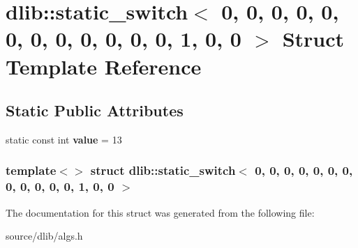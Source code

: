 \hypertarget{structdlib_1_1static__switch_3_010_00_010_00_010_00_010_00_010_00_010_00_010_00_010_00_010_00_01de46d05550779d2bbe7720ab7bfdb3cc}{
\section{dlib::static\_\-switch$<$ 0, 0, 0, 0, 0, 0, 0, 0, 0, 0, 0, 0, 1, 0, 0 $>$ Struct Template Reference}
\label{structdlib_1_1static__switch_3_010_00_010_00_010_00_010_00_010_00_010_00_010_00_010_00_010_00_01de46d05550779d2bbe7720ab7bfdb3cc}
}
\subsection*{Static Public Attributes}
\begin{DoxyCompactItemize}
\item 
\hypertarget{structdlib_1_1static__switch_3_010_00_010_00_010_00_010_00_010_00_010_00_010_00_010_00_010_00_01de46d05550779d2bbe7720ab7bfdb3cc_a0c184f8ebdf3aa4afb71b6df3e17c353}{
static const int {\bfseries value} = 13}
\label{structdlib_1_1static__switch_3_010_00_010_00_010_00_010_00_010_00_010_00_010_00_010_00_010_00_01de46d05550779d2bbe7720ab7bfdb3cc_a0c184f8ebdf3aa4afb71b6df3e17c353}

\end{DoxyCompactItemize}
\subsubsection*{template$<$$>$ struct dlib::static\_\-switch$<$ 0, 0, 0, 0, 0, 0, 0, 0, 0, 0, 0, 0, 1, 0, 0 $>$}



The documentation for this struct was generated from the following file:\begin{DoxyCompactItemize}
\item 
source/dlib/algs.h\end{DoxyCompactItemize}
